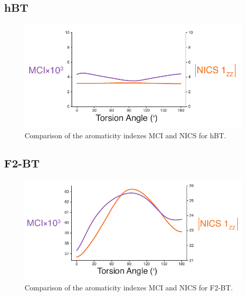 \subsection{hBT}
\begin{figure}[hbt!]
    \centering
    \includegraphics{figures/append_aroma/hpt_aroma_compare_copy.pdf}
    \caption[Comparison of the Aromaticity Indexes MCI and NICS for hBT]{Comparison of the aromaticity indexes MCI and NICS for hBT.}
    \label{fig:hpt_aroma_compare}
\end{figure}

\clearpage
\subsection{F2-BT}
\begin{figure}[hbt!]
    \centering
    \includegraphics{figures/append_aroma/pt_f2_aroma_compare_copy.pdf}
    \caption[Comparison of the Aromaticity Indexes MCI and NICS for F2-BT]{Comparison of the aromaticity indexes MCI and NICS for F2-BT.}
    \label{fig:pt_f2_aroma_compare}
\end{figure}


